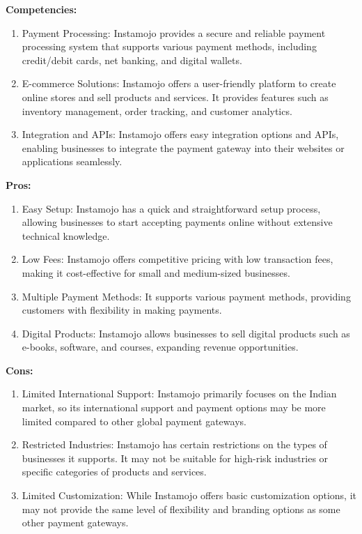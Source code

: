 \textbf{Competencies:}
\begin{enumerate}

    \item  Payment Processing: Instamojo provides a secure and reliable payment processing system that supports various payment methods, including credit/debit cards, net banking, and digital wallets.
    \item  E-commerce Solutions: Instamojo offers a user-friendly platform to create online stores and sell products and services. It provides features such as inventory management, order tracking, and customer analytics.
    \item  Integration and APIs: Instamojo offers easy integration options and APIs, enabling businesses to integrate the payment gateway into their websites or applications seamlessly.


\end{enumerate}
\textbf{Pros:}
\begin{enumerate}

    \item  Easy Setup: Instamojo has a quick and straightforward setup process, allowing businesses to start accepting payments online without extensive technical knowledge.
    \item  Low Fees: Instamojo offers competitive pricing with low transaction fees, making it cost-effective for small and medium-sized businesses.
    \item  Multiple Payment Methods: It supports various payment methods, providing customers with flexibility in making payments.
    \item  Digital Products: Instamojo allows businesses to sell digital products such as e-books, software, and courses, expanding revenue opportunities.

\end{enumerate}
\textbf{Cons:}
\begin{enumerate}


    \item Limited International Support: Instamojo primarily focuses on the Indian market, so its international support and payment options may be more limited compared to other global payment gateways.
    \item Restricted Industries: Instamojo has certain restrictions on the types of businesses it supports. It may not be suitable for high-risk industries or specific categories of products and services.
    \item Limited Customization: While Instamojo offers basic customization options, it may not provide the same level of flexibility and branding options as some other payment gateways.
\end{enumerate}




